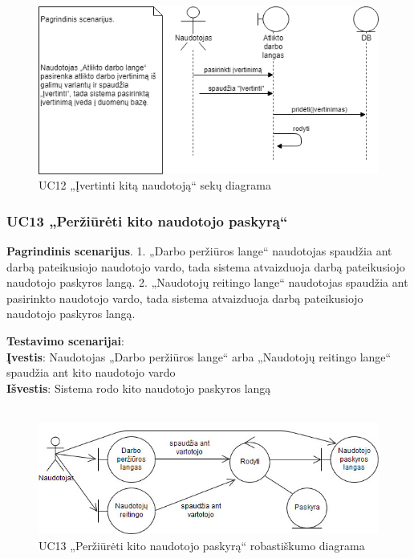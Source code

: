 \documentclass{VUMIFPSbakalaurinis}
\begin{document}
\begin{figure}[H]
	\centering
	\includegraphics[scale=0.6]{img/Sequence/SD12}
	\caption{UC12 „Įvertinti kitą naudotoją“ sekų diagrama}
	\label{img:uc12seq}
\end{figure}

\subsubsection{UC13 „Peržiūrėti kito naudotojo paskyrą“}
\textbf{Pagrindinis scenarijus}. 1. „Darbo peržiūros lange“ naudotojas spaudžia ant darbą pateikusiojo naudotojo vardo, tada sistema atvaizduoja darbą pateikusiojo naudotojo paskyros langą.
2. „Naudotojų reitingo lange“ naudotojas spaudžia ant pasirinkto naudotojo vardo, tada sistema atvaizduoja darbą pateikusiojo naudotojo paskyros langą.
\par \textbf{Testavimo scenarijai}:\\
\textbf{Įvestis}: Naudotojas „Darbo peržiūros lange“ arba „Naudotojų reitingo lange“ spaudžia ant kito naudotojo vardo\\
\textbf{Išvestis}: Sistema rodo kito naudotojo paskyros langą\\ \\

\begin{figure}[H]
	\centering
	\includegraphics[scale=0.6]{img/Robustness/UC13}
	\caption{UC13 „Peržiūrėti kito naudotojo paskyrą“ robastiškumo diagrama}
	\label{img:uc13rob}
\end{figure}
\end{document}
